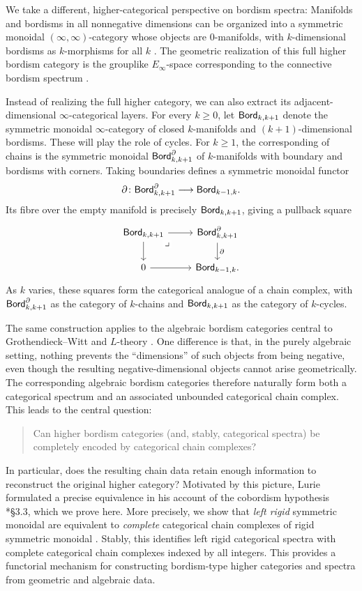 \documentclass[a4paper,11pt]{article}
\begin{document}
We take a different, higher-categorical perspective on bordism spectra:
Manifolds and bordisms in all nonnegative dimensions can be organized into a symmetric monoidal $(\infty,\infty)$-category whose objects are $0$-manifolds, with $k$-dimensional bordisms as $k$-morphisms for all $k$ \cites{LurieCob,CalaqueScheimbauer}. The geometric realization of this full higher bordism category is the grouplike $E_{\infty}$-space corresponding to the connective bordism spectrum
\cite{SPinv}.

Instead of realizing the full higher category, we can also extract its
adjacent-dimensional $\infty$-categorical layers. For every $k\geq0$,
let $\textup{\textsf{Bord}}_{k,k+1}$ denote the symmetric monoidal $\infty$-category
of closed $k$-manifolds and $(k+1)$-dimensional bordisms. These
\icats{} will play the role of cycles. For $k\geq1$, the
corresponding \icat{} of chains is the symmetric monoidal
\icat{} $\textup{\textsf{Bord}}^\partial_{k,k+1}$ of $k$-manifolds with
boundary and bordisms with corners. Taking boundaries defines a
symmetric monoidal functor
\[
  \partial\colon
  \textup{\textsf{Bord}}^\partial_{k,k+1}\longrightarrow\textup{\textsf{Bord}}_{k-1,k}.
\]
Its fibre over the empty manifold is precisely $\textup{\textsf{Bord}}_{k,k+1}$,
giving a pullback square
\[
  \begin{tikzcd}
    \Bord_{k,k+1}\ar[r]\ar[d]\drpullback
      & \Bord^\partial_{k,k+1}\ar[d,"\partial"]\\
    0\ar[r] & \Bord_{k-1,k}.
  \end{tikzcd}
\]
As $k$ varies, these squares form the categorical analogue of a chain
complex, with $\textup{\textsf{Bord}}^\partial_{k,k+1}$ as the category of $k$-chains
and $\textup{\textsf{Bord}}_{k,k+1}$ as the category of $k$-cycles.

The same construction applies to the algebraic bordism categories central to Grothendieck--Witt and $L$-theory \cites{CalmesEtAlI,CalmesEtAlII,CalmesEtAl}. One difference is that, in the purely algebraic setting, nothing prevents the ``dimensions'' of such objects from being negative, even though the resulting negative-dimensional objects cannot arise geometrically. The corresponding algebraic bordism categories therefore naturally form both a categorical spectrum and an associated unbounded categorical chain complex. This leads to the central question:
\begin{quote}
Can higher bordism categories (and, stably, categorical spectra) be completely encoded by categorical chain complexes?
\end{quote}
In particular, does the resulting chain data retain enough information to reconstruct the original higher category? Motivated by this picture, Lurie formulated a precise equivalence in his account of the cobordism hypothesis \cite{LurieCob}*{\S3.3}, which we prove here. More precisely, we show that \emph{left rigid} symmetric monoidal \incats{} are equivalent to \emph{complete} categorical chain complexes of rigid symmetric monoidal \icats{}. Stably, this identifies left rigid categorical spectra with complete categorical chain complexes indexed by all integers. This provides a functorial mechanism for constructing bordism-type higher categories and spectra from geometric and algebraic data. 
\end{document}
